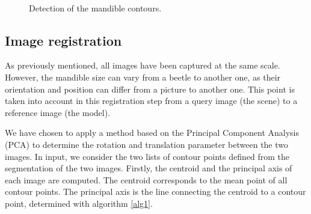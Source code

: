 \documentclass[twoside,twocolumn,10pt]{article}
\begin{document}
\begin{figure}[htbp]
\centering
{}~~
\caption{Detection of the mandible contours.}
\label{canny}
\end{figure}


\subsection{Image registration}
\label{sec:registration}

As previously mentioned, all images have been captured at the same scale.
However, the mandible size can vary from a beetle to another one, as their orientation and position can differ from a picture to another one.
This point is taken into account in this registration step from a query image (the scene) to a reference image (the model).

We have chosen to apply a method based on the Principal Component Analysis (PCA) \cite{bsspca,shlens2014tutorial} to determine the rotation and translation parameter between the two images.
In input, we consider the two lists of contour points defined from the segmentation of the two images.
Firstly, the centroid and the principal axis of each image are computed.
The centroid corresponds to the mean point of all contour points.
The principal axis is the line connecting the centroid to a contour point, determined with algorithm \ref{alg1}.
\end{document}
